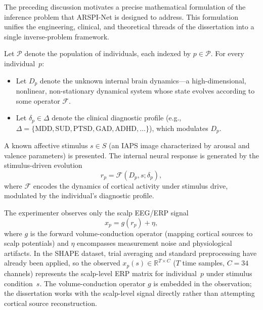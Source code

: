 The preceding discussion motivates a precise mathematical formulation of the inference problem that ARSPI-Net is designed to address. This formulation unifies the engineering, clinical, and theoretical threads of the dissertation into a single inverse-problem framework.

Let $\mathcal{P}$ denote the population of individuals, each indexed by $p \in \mathcal{P}$. For every individual~$p$:
\begin{itemize}
    \item Let $D_p$ denote the unknown internal brain dynamics---a high-dimensional, nonlinear, non-stationary dynamical system whose state evolves according to some operator $\mathcal{F}$.
    \item Let $\delta_p \in \Delta$ denote the clinical diagnostic profile (e.g., $\Delta = \{\text{MDD}, \text{SUD}, \text{PTSD}, \text{GAD}, \text{ADHD}, \ldots\}$), which modulates $D_p$.
\end{itemize}

A known affective stimulus $s \in S$ (an IAPS image characterized by arousal and valence parameters) is presented. The internal neural response is generated by the stimulus-driven evolution
\begin{equation}
    r_p = \mathcal{F}(D_p, s; \delta_p),
    \label{eq:forward_dynamics}
\end{equation}
where $\mathcal{F}$ encodes the dynamics of cortical activity under stimulus drive, modulated by the individual's diagnostic profile.

The experimenter observes only the scalp EEG/ERP signal
\begin{equation}
    x_p = g(r_p) + \eta,
    \label{eq:observation}
\end{equation}
where $g$ is the forward volume-conduction operator (mapping cortical sources to scalp potentials) and $\eta$ encompasses measurement noise and physiological artifacts. In the SHAPE dataset, trial averaging and standard preprocessing have already been applied, so the observed $x_p(s) \in \mathbb{R}^{T \times C}$ ($T$ time samples, $C = 34$ channels) represents the scalp-level ERP matrix for individual~$p$ under stimulus condition~$s$. The volume-conduction operator $g$ is embedded in the observation; the dissertation works with the scalp-level signal directly rather than attempting cortical source reconstruction.

